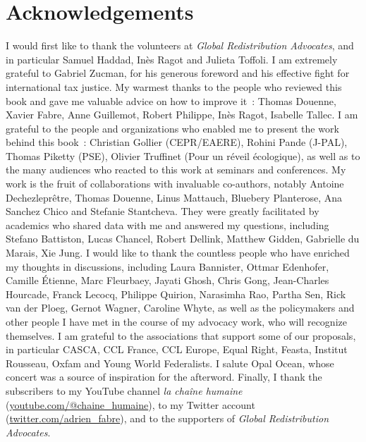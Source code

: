 \documentclass[a5paper,french,openany]{memoir}
\begin{document}
\section*{Acknowledgements}\label{sec:merci} 
I would first like to thank the volunteers at \textit{Global Redistribution Advocates}, and in particular Samuel Haddad, Inès Ragot and Julieta Toffoli. I am extremely grateful to Gabriel Zucman, for his generous foreword and his effective fight for international tax justice. My warmest thanks to the people who reviewed this book and gave me valuable advice on how to improve it~: Thomas Douenne, Xavier Fabre, Anne Guillemot, Robert Philippe, Inès Ragot, Isabelle Tallec. I am grateful to the people and organizations who enabled me to present the work behind this book~: Christian Gollier (CEPR/EAERE), Rohini Pande (J-PAL), Thomas Piketty (PSE), Olivier Truffinet (Pour un réveil écologique), as well as to the many audiences who reacted to this work at seminars and conferences. My work is the fruit of collaborations with invaluable co-authors, notably Antoine Dechezleprêtre, Thomas Douenne, Linus Mattauch, Bluebery Planterose, Ana Sanchez Chico and Stefanie Stantcheva. 
They were greatly facilitated by academics who shared data with me and answered my questions, including Stefano Battiston, Lucas Chancel, Robert Dellink, Matthew Gidden, Gabrielle du Marais, Xie Jung. %
I would like to thank the countless people who have enriched my thoughts in discussions, including Laura Bannister, Ottmar Edenhofer, Camille Étienne, Marc Fleurbaey, Jayati Ghosh, Chris Gong, Jean-Charles Hourcade, Franck Lecocq, Philippe Quirion, Narasimha Rao, Partha Sen, Rick van der Ploeg, Gernot Wagner, Caroline Whyte, as well as the policymakers and other people I have met in the course of my advocacy work, who will recognize themselves. I am grateful to the associations that support some of our proposals, 
in particular CASCA, CCL France, CCL Europe, Equal Right, Feasta, Institut Rousseau, Oxfam and Young World Federalists. I salute Opal Ocean, whose concert was a source of inspiration for the afterword. Finally, I thank the subscribers to my YouTube channel \textit{la chaîne humaine} (\href{https://www.youtube.com/@chaine_humaine}{youtube.com/@chaine\_humaine}), to my Twitter account (\href{https://twitter.com/adrien_fabre}{twitter.com/adrien\_fabre}), and to the supporters of \textit{Global Redistribution Advocates}.


\pagebreak \vspace*{-2cm}
\listoftables \vspace{-1cm}
\listoffigures
\end{document}
